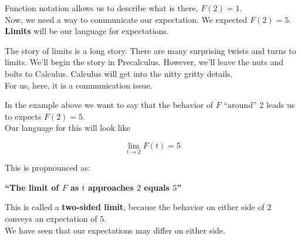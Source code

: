 \documentclass{ximera}
\begin{document}
Function notation allows us to describe what is there, $F(2) = 1$. \\

Now, we need a way to communicate our expectation.  We expected $F(2) = 5$. \\






\textbf{\textcolor{purple!85!blue}{Limits}} will be our language for expectations. \\

\begin{warning}
The story of limits is a long story.  There are many surprising twists and turns to limits. We'll begin the story in Precalculus.  However, we'll leave the nuts and bolts to Calculus. Calculus will get into the nitty gritty details. \\

For us, here, it is a communication issue.
\end{warning}






\begin{idea}

In the example above we want to say that the behavior of $F$ ``around'' $2$ leads us to expects $F(2)=5$.\\

Our language for this will look like

\[   \lim\limits_{t \to 2} F(t) = 5\]


This is propnounced as: 


\begin{center}
\textbf{\textcolor{red!80!black}{``The limit of $F$ as $t$ approaches $2$ equals $5$''}}
\end{center}



\end{idea}






This is called a \textbf{\textcolor{purple!85!blue}{two-sided limit}}, because the behavior on either side of $2$ conveys an expectation of $5$. \\





We have seen that our expectations may differ on either side. \\
\end{document}
